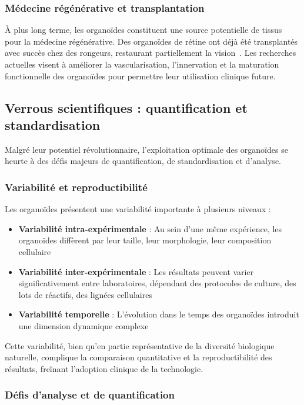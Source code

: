 \subsubsection{Médecine régénérative et transplantation}

À plus long terme, les organoïdes constituent une source potentielle de tissus pour la médecine régénérative. Des organoïdes de rétine ont déjà été transplantés avec succès chez des rongeurs, restaurant partiellement la vision~\cite{Lin2020}. Les recherches actuelles visent à améliorer la vascularisation, l'innervation et la maturation fonctionnelle des organoïdes pour permettre leur utilisation clinique future.

\subsection{Verrous scientifiques : quantification et standardisation}

Malgré leur potentiel révolutionnaire, l'exploitation optimale des organoïdes se heurte à des défis majeurs de quantification, de standardisation et d'analyse.

\subsubsection{Variabilité et reproductibilité}

Les organoïdes présentent une variabilité importante à plusieurs niveaux :
\begin{itemize}
    \item \textbf{Variabilité intra-expérimentale} : Au sein d'une même expérience, les organoïdes diffèrent par leur taille, leur morphologie, leur composition cellulaire
    \item \textbf{Variabilité inter-expérimentale} : Les résultats peuvent varier significativement entre laboratoires, dépendant des protocoles de culture, des lots de réactifs, des lignées cellulaires
    \item \textbf{Variabilité temporelle} : L'évolution dans le temps des organoïdes introduit une dimension dynamique complexe
\end{itemize}

Cette variabilité, bien qu'en partie représentative de la diversité biologique naturelle, complique la comparaison quantitative et la reproductibilité des résultats, freînant l'adoption clinique de la technologie.

\subsubsection{Défis d'analyse et de quantification}

